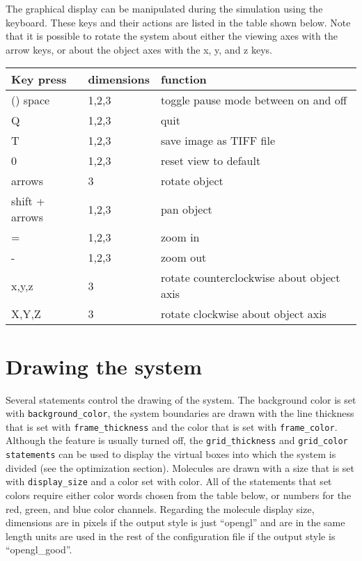 \documentclass {scrbook}
\newcommand {\ttt} {\texttt}
\begin{document}
The graphical display can be manipulated during the simulation using the keyboard. These keys and their actions are listed in the table shown below. Note that it is possible to rotate the system about either the viewing axes with the arrow keys, or about the object axes with the x, y, and z keys.

\begin{longtable}[c]{lll}
Key press & dimensions & function\\
\hline()
space & 1,2,3 & toggle pause mode between on and off\\
Q & 1,2,3 & quit\\
T & 1,2,3 & save image as TIFF file\\
0 & 1,2,3 & reset view to default\\
arrows & 3 & rotate object\\
shift + arrows & 1,2,3 & pan object\\
= & 1,2,3 & zoom in\\
- & 1,2,3 & zoom out\\
x,y,z & 3 & rotate counterclockwise about object axis\\
X,Y,Z & 3 & rotate clockwise about object axis\\
\end{longtable}

\section{Drawing the system}

Several statements control the drawing of the system. The background color is set with \ttt{background\_color}, the system boundaries are drawn with the line thickness that is set with \ttt{frame\_thickness} and the color that is set with \ttt{frame\_color}. Although the feature is usually turned off, the \ttt{grid\_thickness} and \ttt{grid\_color statements} can be used to display the virtual boxes into which the system is divided (see the optimization section). Molecules are drawn with a size that is set with \ttt{display\_size} and a color set with color. All of the statements that set colors require either color words chosen from the table below, or numbers for the red, green, and blue color channels. Regarding the molecule display size, dimensions are in pixels if the output style is just ``opengl'' and are in the same length units are used in the rest of the configuration file if the output style is ``opengl\_good''.

\end{document}
